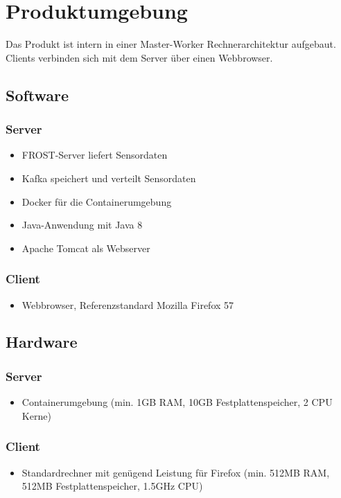 \chapter{Produktumgebung}
Das Produkt ist intern in einer Master-Worker Rechnerarchitektur aufgebaut. Clients verbinden sich mit dem Server über einen Webbrowser.
\section{Software}
\subsection{Server}
\begin{itemize}
	\item FROST-Server liefert Sensordaten
	\item Kafka speichert und verteilt Sensordaten
	\item Docker für die Containerumgebung
	\item Java-Anwendung mit Java 8
	\item Apache Tomcat als Webserver
\end{itemize}
\subsection{Client}
\begin{itemize}
	\item Webbrowser, Referenzstandard Mozilla Firefox 57
\end{itemize}
\section{Hardware}
\subsection{Server}
\begin{itemize}
	\item Containerumgebung (min. 1GB RAM, 10GB Festplattenspeicher, 2 CPU Kerne)
\end{itemize}
\subsection{Client}
\begin{itemize}
	\item Standardrechner mit genügend Leistung für Firefox (min. 512MB RAM, 512MB Festplattenspeicher, 1.5GHz CPU)
\end{itemize}